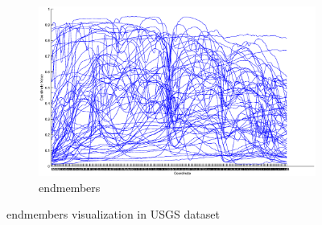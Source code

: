 \documentclass[14pt]{book}
\begin{document}
 \begin{figure}
        \centering
        \begin{subfigure}[b]{1.0\textwidth}
                \centering
                \includegraphics[width=\textwidth]{endmembers2.eps}
                \caption{endmembers }
                \label{fig:endmembers visualization in USGS dataset}
        \end{subfigure}%

        \caption{endmembers visualization in USGS dataset }\label{fig:animals}
\end{figure}
\end{document}
